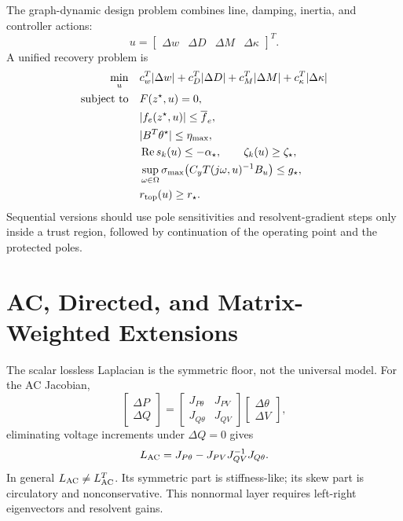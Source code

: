 The graph-dynamic design problem combines line, damping, inertia, and
controller actions:
\begin{equation}
  u=
  \begin{bmatrix}
  \Delta w & \Delta D & \Delta M & \Delta\kappa
  \end{bmatrix}^T.
  \label{eq:graph_design_vector}
\end{equation}
A unified recovery problem is
\begin{align}
  \min_u\quad&
  c_w^T|\Delta w|
  +c_D^T|\Delta D|
  +c_M^T|\Delta M|
  +c_\kappa^T|\Delta\kappa|
  \label{eq:graph_recovery_problem}\\
  \text{subject to}\quad&
  F(z^\star,u)=0,\nonumber\\
  &|f_e(z^\star,u)|\le \overline f_e,\nonumber\\
  &|B^T\theta^\star|\le \eta_{\max},\nonumber\\
  &\operatorname{Re} s_k(u)\le-\alpha_\star,\qquad
    \zeta_k(u)\ge\zeta_\star,\nonumber\\
  &\sup_{\omega\in\Omega}
    \sigma_{\max}\!\left(C_yT(j\omega,u)^{-1}B_u\right)
    \le g_\star,\nonumber\\
  &r_{\rm top}(u)\ge r_\star.\nonumber
\end{align}
Sequential versions should use pole sensitivities and resolvent-gradient
steps only inside a trust region, followed by continuation of the operating
point and the protected poles.

\section{AC, Directed, and Matrix-Weighted Extensions}

The scalar lossless Laplacian is the symmetric floor, not the universal model.
For the AC Jacobian,
\begin{equation}
  \begin{bmatrix}
  \Delta P\\
  \Delta Q
  \end{bmatrix}
  =
  \begin{bmatrix}
  J_{P\theta}&J_{PV}\\
  J_{Q\theta}&J_{QV}
  \end{bmatrix}
  \begin{bmatrix}
  \Delta\theta\\
  \Delta V
  \end{bmatrix},
  \label{eq:graph_ac_jacobian}
\end{equation}
eliminating voltage increments under \(\Delta Q=0\) gives
\begin{equation}
  L_{\rm AC}
  =
  J_{P\theta}-J_{PV}J_{QV}^{-1}J_{Q\theta}.
  \label{eq:graph_ac_condensed_L}
\end{equation}
In general \(L_{\rm AC}\ne L_{\rm AC}^T\). Its symmetric part is
stiffness-like; its skew part is circulatory and nonconservative. This
nonnormal layer requires left-right eigenvectors and resolvent gains.


